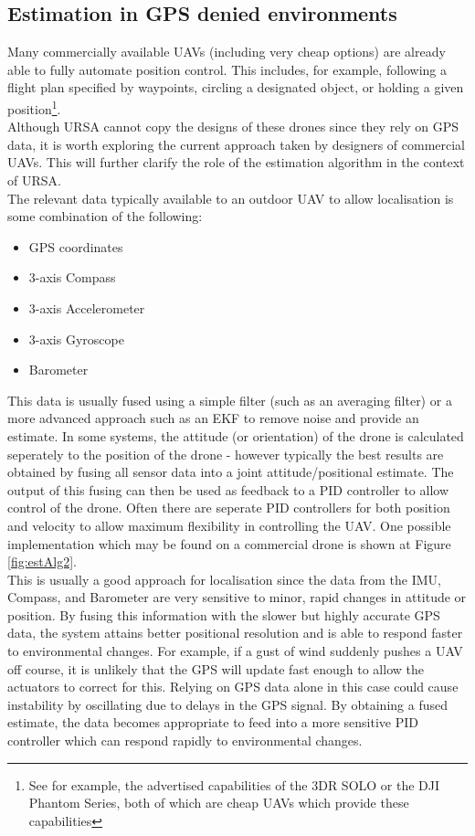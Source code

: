 \documentclass[capstone_report.tex]{subfiles}
\begin{document}
\subsection{Estimation in GPS denied environments}
 Many commercially available UAVs (including very cheap options) are already able to fully automate position control. This includes, for example, following a flight plan specified by waypoints, circling a designated object, or holding a given position\footnote{See for example, the advertised capabilities of the 3DR SOLO or the DJI Phantom Series, both of which are cheap UAVs which provide these capabilities}.\\ 

Although URSA cannot copy the designs of these drones since they rely on GPS data, it is worth exploring the current approach taken by designers of commercial UAVs. This will further clarify the role of the estimation algorithm in the context of URSA.\\

The relevant data typically available to an outdoor UAV to allow localisation is some combination of the following:
\begin{itemize}
	\item GPS coordinates
	\item 3-axis Compass
	\item 3-axis Accelerometer
	\item 3-axis Gyroscope
	\item Barometer
\end{itemize}

This data is usually fused using a simple filter (such as an averaging filter) or a more advanced approach such as an EKF to remove noise and provide an estimate. In some systems, the attitude (or orientation) of the drone is calculated seperately to the position of the drone - however typically the best results are obtained by fusing all sensor data into a joint attitude/positional estimate. The output of this fusing can then be used as feedback to a PID controller to allow control of the drone. Often there are seperate PID controllers for both position and velocity to allow maximum flexibility in controlling the UAV. One possible implementation which may be found on a commercial drone is shown at Figure \ref{fig:estAlg2}. \\

This is usually a good approach for localisation since the data from the IMU, Compass, and Barometer are very sensitive to minor, rapid changes in attitude or position. By fusing this information with the slower but highly accurate GPS data, the system attains better positional resolution and is able to respond faster to environmental changes. For example, if a gust of wind suddenly pushes a UAV off course, it is unlikely that the GPS will update fast enough to allow the actuators to correct for this. Relying on GPS data alone in this case could cause instability by oscillating due to delays in the GPS signal. By obtaining a fused estimate, the data becomes appropriate to feed into a more sensitive PID controller which can respond rapidly to environmental changes.
\end{document}

